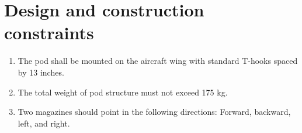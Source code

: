 \documentclass[Main]{subfiles}
\begin{document}
\section{Design and construction constraints}

\begin{enumerate}[{SR}-4.1]
\item The pod shall be mounted on the aircraft wing with standard T-hooks spaced by 13 inches.

\item The total weight of pod structure must not exceed 175 kg.

\item Two magazines should point in the following directions: Forward, backward, left, and right.

\end{enumerate}
\end{document}
